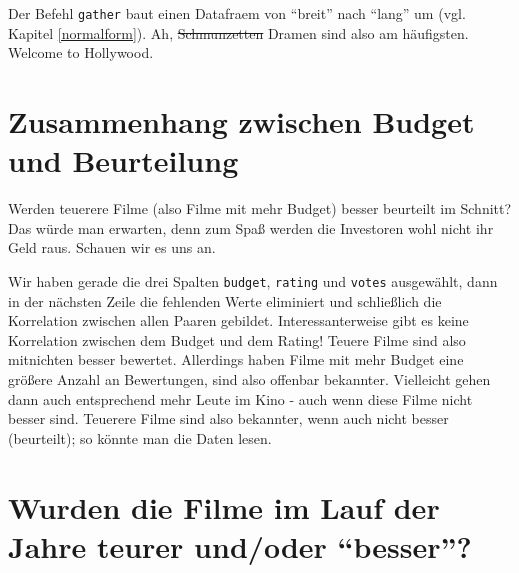 \documentclass[12pt,ngerman,]{book}
\makeatletter
\newenvironment{Shaded}{\begin{snugshade}}{\end{snugshade}}
\newcommand{\KeywordTok}[1]{\textcolor[rgb]{0.13,0.29,0.53}{\textbf{{#1}}}}
\newcommand{\StringTok}[1]{\textcolor[rgb]{0.31,0.60,0.02}{{#1}}}
\newcommand{\CommentTok}[1]{\textcolor[rgb]{0.56,0.35,0.01}{\textit{{#1}}}}
\newcommand{\NormalTok}[1]{{#1}}
\newenvironment{kframe}{%
\medskip{}
\setlength{\fboxsep}{.8em}
 \def\at@end@of@kframe{}%
 \ifinner\ifhmode%
  \def\at@end@of@kframe{\end{minipage}}%
  \begin{minipage}{\columnwidth}%
 \fi\fi%
 \def\FrameCommand##1{\hskip\@totalleftmargin \hskip-\fboxsep
 \colorbox{shadecolor}{##1}\hskip-\fboxsep
     \hskip-\linewidth \hskip-\@totalleftmargin \hskip\columnwidth}%
 \MakeFramed {\advance\hsize-\width
   \@totalleftmargin\z@ \linewidth\hsize
   \@setminipage}}%
 {\par\unskip\endMakeFramed%
 \at@end@of@kframe}
\renewenvironment{Shaded}{\begin{kframe}}{\end{kframe}}
\makeatother
\begin{document}
Der Befehl \texttt{gather} baut einen Datafraem von ``breit'' nach
``lang'' um (vgl. Kapitel \ref{normalform}). Ah, \sout{Schmunzetten}
Dramen sind also am häufigsten. Welcome to Hollywood.

\section{Zusammenhang zwischen Budget und
Beurteilung}\label{zusammenhang-zwischen-budget-und-beurteilung}

Werden teuerere Filme (also Filme mit mehr Budget) besser beurteilt im
Schnitt? Das würde man erwarten, denn zum Spaß werden die Investoren
wohl nicht ihr Geld raus. Schauen wir es uns an.

\begin{Shaded}
\end{Shaded}

Wir haben gerade die drei Spalten \texttt{budget}, \texttt{rating} und
\texttt{votes} ausgewählt, dann in der nächsten Zeile die fehlenden
Werte eliminiert und schließlich die Korrelation zwischen allen Paaren
gebildet. Interessanterweise gibt es keine Korrelation zwischen dem
Budget und dem Rating! Teuere Filme sind also mitnichten besser
bewertet. Allerdings haben Filme mit mehr Budget eine größere Anzahl an
Bewertungen, sind also offenbar bekannter. Vielleicht gehen dann auch
entsprechend mehr Leute im Kino - auch wenn diese Filme nicht besser
sind. Teuerere Filme sind also bekannter, wenn auch nicht besser
(beurteilt); so könnte man die Daten lesen.

\section{\texorpdfstring{Wurden die Filme im Lauf der Jahre teurer
und/oder
``besser''?}{Wurden die Filme im Lauf der Jahre teurer und/oder besser?}}\label{wurden-die-filme-im-lauf-der-jahre-teurer-undoder-besser}

\begin{Shaded}
\end{Shaded}
\end{document}

